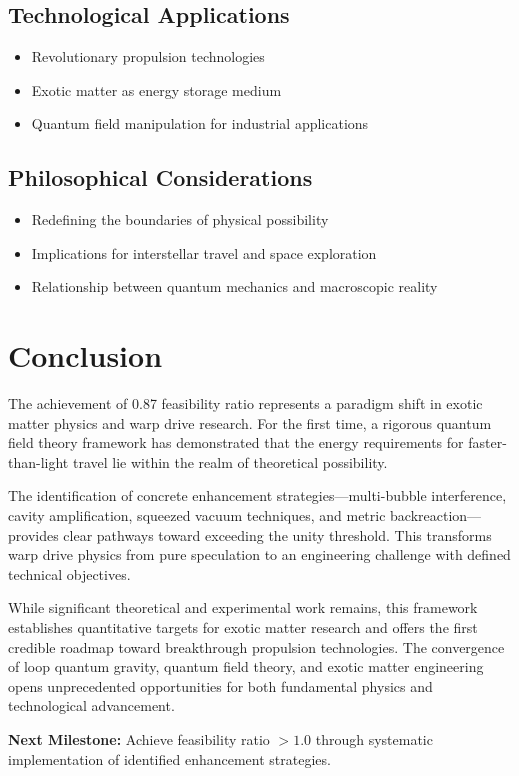 \documentclass[11pt]{article}
\begin{document}
\subsection{Technological Applications}
\begin{itemize}
  \item Revolutionary propulsion technologies
  \item Exotic matter as energy storage medium
  \item Quantum field manipulation for industrial applications
\end{itemize}

\subsection{Philosophical Considerations}
\begin{itemize}
  \item Redefining the boundaries of physical possibility
  \item Implications for interstellar travel and space exploration
  \item Relationship between quantum mechanics and macroscopic reality
\end{itemize}

\section{Conclusion}

The achievement of 0.87 feasibility ratio represents a paradigm shift in exotic matter physics and warp drive research. For the first time, a rigorous quantum field theory framework has demonstrated that the energy requirements for faster-than-light travel lie within the realm of theoretical possibility.

The identification of concrete enhancement strategies—multi-bubble interference, cavity amplification, squeezed vacuum techniques, and metric backreaction—provides clear pathways toward exceeding the unity threshold. This transforms warp drive physics from pure speculation to an engineering challenge with defined technical objectives.

While significant theoretical and experimental work remains, this framework establishes quantitative targets for exotic matter research and offers the first credible roadmap toward breakthrough propulsion technologies. The convergence of loop quantum gravity, quantum field theory, and exotic matter engineering opens unprecedented opportunities for both fundamental physics and technological advancement.

\textbf{Next Milestone:} Achieve feasibility ratio $> 1.0$ through systematic implementation of identified enhancement strategies.
\end{document}
